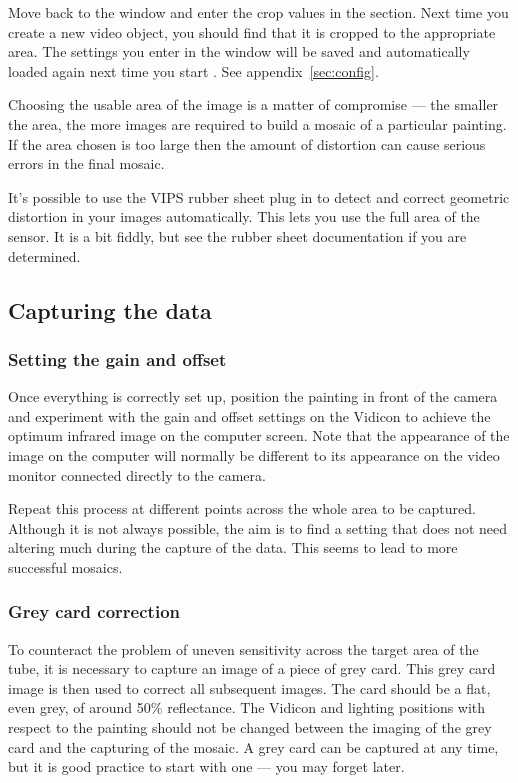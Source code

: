 Move back to the  window and enter the crop values in the
 section.  Next time you create a new video object,
you should find that it is cropped to the appropriate area.  The settings
you enter in the  window will be saved and automatically
loaded again next time you start \nip{}. See appendix~\ref{sec:config}.

Choosing the usable area of the image is a matter of compromise --- the
smaller the area, the more images are required to build a mosaic of a
particular painting. If the area chosen is too large then the amount of
distortion can cause serious errors in the final mosaic.

It's possible to use the VIPS rubber sheet plug in to detect and correct
geometric distortion in your images automatically. This lets you use the
full area of the sensor. It is a bit fiddly, but see the rubber sheet
documentation if you are determined.

\subsection{Capturing the data}

\subsubsection{Setting the gain and offset}

Once everything is correctly set up, position the painting in front of the
camera and experiment with the gain and offset settings on the Vidicon to
achieve the optimum infrared image on the computer screen. Note that the
appearance of the image on the computer will normally be different to its
appearance on the video monitor connected directly to the camera.

Repeat this process at different points across the whole area to be captured.
Although it is not always possible, the aim is to find a setting that does
not need altering much during the capture of the data. This seems to lead
to more successful mosaics.

\subsubsection{Grey card correction}

To counteract the problem of uneven sensitivity across the target area of the
tube, it is necessary to capture an image of a piece of grey card. This grey
card image is then used to correct all subsequent images. The card should be a
flat, even grey, of around 50\% reflectance. The Vidicon and lighting
positions with respect to the painting should not be changed between the
imaging of the grey card and the capturing of the mosaic. A grey card can be
captured at any time, but it is good practice to start with one --- you may
forget later.


